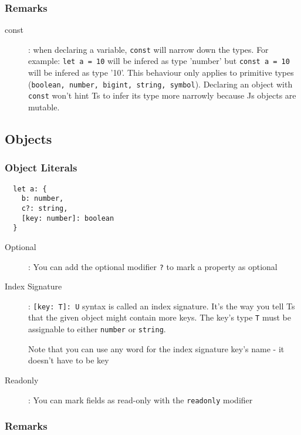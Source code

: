 \documentclass[french]{article}
\begin{document}
\subsubsection{Remarks}

\begin{description}
  \item[const]: when declaring a variable, \lstinline{const} will narrow down the types. For example: \lstinline{let a = 10} will be infered as type 'number' but \lstinline{const a = 10} will be infered as type '10'. This behaviour only applies to primitive types (\lstinline{boolean, number, bigint, string, symbol}). Declaring an object with \lstinline{const} won't hint Ts to infer its type more narrowly because Js objects are mutable.
\end{description}

\subsection{Objects}

\subsubsection{Object Literals}

\begin{lstlisting}
  let a: {
    b: number,
    c?: string,
    [key: number]: boolean
  }
\end{lstlisting}

\begin{description}
  \item[Optional]: You can add the optional modifier \lstinline{?} to mark a property as optional
  \item[Index Signature]: 
    \lstinline{[key: T]: U} syntax is called an index signature. It's the way you tell Ts that the given object might contain more keys. The key's type \lstinline{T} must be assignable to either \lstinline{number} or \lstinline{string}.

    Note that you can use any word for the index signature key's name - it doesn't have to be key
  \item[Readonly]: You can mark fields as read-only with the \lstinline{readonly} modifier
\end{description}


\subsubsection*{Remarks}
\end{document}
